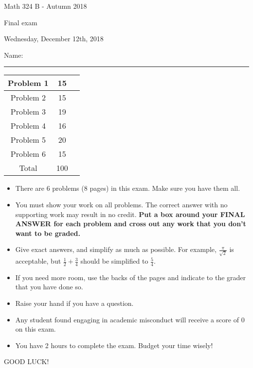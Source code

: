 \documentclass[12 pt]{report}
\begin{document}
\noindent \vfill \noindent \large

\centerline{Math 324 B  - Autumn 2018}

\centerline{Final exam}

\centerline{Wednesday, December 12th, 2018}

\normalsize

\vfill
\medskip
Name: \rule{10cm}{1pt}

\bigskip

\vfill
\begin{center}
{\large
\begin{tabular}{||c|c|r||}
\hline Problem 1 & 15 & \hspace{10mm} \hfill \\
\hline Problem 2 & 15 & \hspace{10mm} \hfill \\
\hline Problem 3 & 19 & \hspace{10mm} \hfill \\
\hline Problem 4 & 16  & \hspace{10mm} \hfill \\
\hline Problem 5 & 20  & \hspace{10mm} \hfill \\
\hline Problem 6 &  15 & \hspace{10mm} \hfill \\
\hline Total & 100 & \hspace{10mm} \hfill \\
\hline
\end{tabular}
}
\end{center}
\vfill
\begin{itemize}
\item There are 6 problems (8 pages) in this exam. Make sure you have them all. 
\item You must show your work on all problems.  The correct answer
with no supporting work may result in no credit. \textbf{Put a box
around your FINAL ANSWER for each problem and cross out any work
that you don't want to be graded.} 
\item Give exact answers, and simplify as much as possible. 
For example, $\frac{\pi}{\sqrt{2}}$ is acceptable, but $\frac{1}{2} + \frac{3}{4}$
should be simplified to $\frac{5}{4}$.   

\item If you need more room, use the backs
of the pages and indicate to the grader that you have done so.
\item Raise your hand if you have a question.
\item Any student found engaging in academic misconduct will receive
a score of 0 on this exam.
\item You have 2 hours to complete the exam.  Budget your time wisely! \\
\end{itemize}
\vfill
\begin{center}GOOD LUCK!\end{center}
\end{document}

